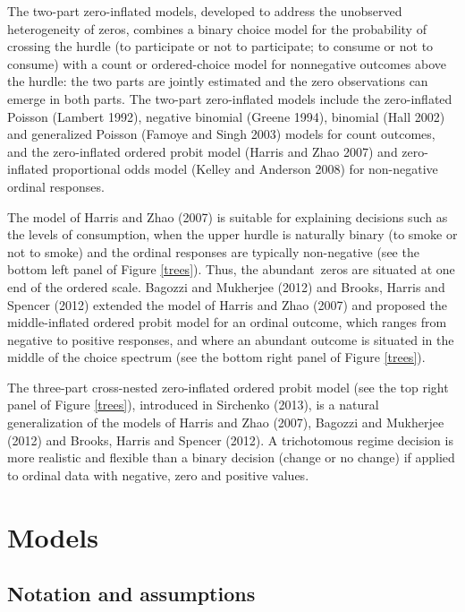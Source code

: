 \documentclass[letterpaper,fleqn,12pt]{article}
\begin{document}
\begin{onehalfspace}
The two-part zero-inflated models, developed to address the unobserved
heterogeneity of zeros, combines a binary choice model for the probability
of crossing the hurdle (to participate or not to participate; to consume or
not to consume) with a count or ordered-choice model for nonnegative
outcomes above the hurdle: the two parts are jointly estimated and the zero
observations can emerge in both parts. The two-part zero-inflated models
include the zero-inflated Poisson (Lambert 1992), negative binomial (Greene
1994), binomial (Hall 2002) and generalized Poisson (Famoye and Singh 2003)
models for count outcomes, and the zero-inflated ordered probit model
(Harris and Zhao 2007) and zero-inflated proportional odds model (Kelley and
Anderson 2008) for non-negative ordinal responses.

The model of Harris and Zhao (2007) is suitable for explaining decisions
such as the levels of consumption, when the upper hurdle is naturally binary
(to smoke or not to smoke) and the ordinal responses are typically
non-negative (see the bottom left panel of Figure \ref{trees}). Thus, the
abundant\ zeros are situated at one end of the ordered scale. Bagozzi and
Mukherjee (2012) and Brooks, Harris and Spencer (2012) extended the model of
Harris and Zhao (2007) and proposed the middle-inflated ordered probit model
for an ordinal outcome, which ranges from negative to positive responses,
and where an abundant outcome is situated in the middle of the choice
spectrum (see the bottom right panel of Figure \ref{trees}).

The three-part cross-nested zero-inflated ordered probit model (see the top
right panel of Figure \ref{trees}), introduced in Sirchenko (2013), is a
natural generalization of the models of Harris and Zhao (2007), Bagozzi and
Mukherjee (2012) and Brooks, Harris and Spencer (2012). A trichotomous
regime decision is more realistic and flexible than a binary decision
(change or no change) if applied to ordinal data with negative, zero and
positive values.

\section{\noindent Models}

\subsection{Notation and assumptions}


\end{onehalfspace}
\end{document}
